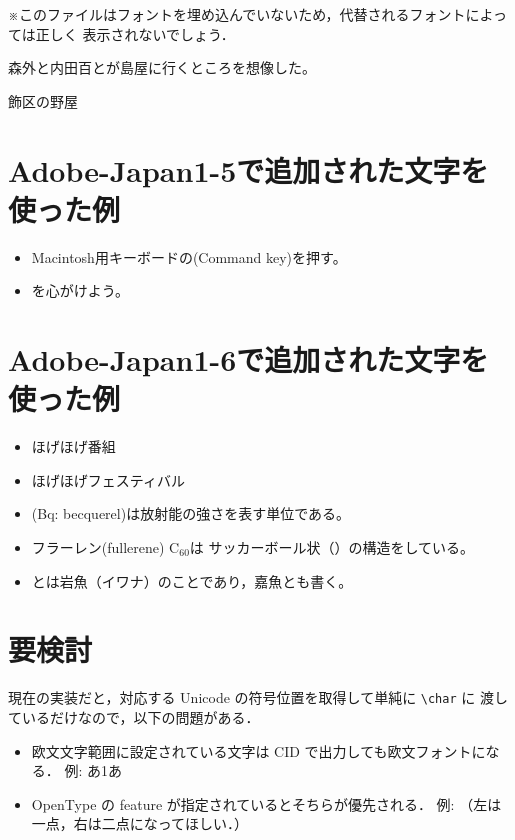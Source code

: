 \documentclass{bxjsarticle}
\begin{document}
※このファイルはフォントを埋め込んでいないため，代替されるフォントによっては正しく
表示されないでしょう．

森外と内田百とが島屋に行くところを想像した。

飾区の野屋

\section*{Adobe-Japan1-5で追加された文字を使った例}
\begin{itemize}
  \item Macintosh用キーボードの(Command key)を押す。
  \item {}を心がけよう。
\end{itemize}

\section*{Adobe-Japan1-6で追加された文字を使った例}
\begin{itemize}
  \item ほげほげ番組
  \item ほげほげフェスティバル
  \item {}(Bq: becquerel)は放射能の強さを表す単位である。
  \item フラーレン(fullerene) C$_{60}$は
        サッカーボール状（）の構造をしている。
  \item {}とは岩魚（イワナ）のことであり，嘉魚とも書く。
\end{itemize}

\section*{要検討}
現在の実装だと，対応する Unicode の符号位置を取得して単純に \verb|\char| に
渡しているだけなので，以下の問題がある．
\begin{itemize}
\item 欧文文字範囲に設定されている文字は CID で出力しても欧文フォントになる．
  例: あ1あ
\item OpenType の feature が指定されているとそちらが優先される．
  例: {}
  （左は一点，右は二点になってほしい．）
\end{itemize}
\end{document}
